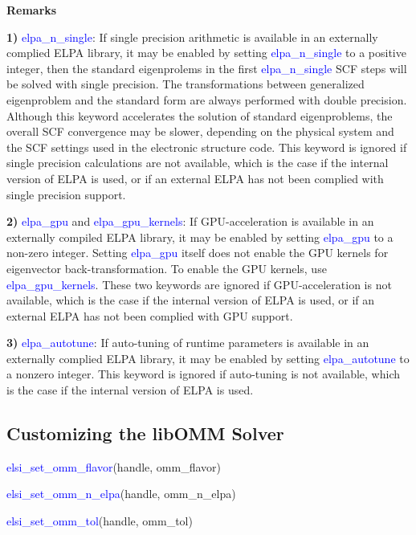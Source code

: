 \documentclass{report}
\begin{document}
\textbf{Remarks}

\textbf{1)} \textcolor{blue}{elpa\_n\_single}: If single precision arithmetic is available in an externally complied ELPA library, it may be enabled by setting \textcolor{blue}{elpa\_n\_single} to a positive integer, then the standard eigenprolems in the first \textcolor{blue}{elpa\_n\_single} SCF steps will be solved with single precision. The transformations between generalized eigenproblem and the standard form are always performed with double precision. Although this keyword accelerates the solution of standard eigenproblems, the overall SCF convergence may be slower, depending on the physical system and the SCF settings used in the electronic structure code. This keyword is ignored if single precision calculations are not available, which is the case if the internal version of ELPA is used, or if an external ELPA has not been complied with single precision support.

\textbf{2)} \textcolor{blue}{elpa\_gpu} and \textcolor{blue}{elpa\_gpu\_kernels}: If GPU-acceleration is available in an externally compiled ELPA library, it may be enabled by setting \textcolor{blue}{elpa\_gpu} to a non-zero integer. Setting \textcolor{blue}{elpa\_gpu} itself does not enable the GPU kernels for eigenvector back-transformation. To enable the GPU kernels, use \textcolor{blue}{elpa\_gpu\_kernels}. These two keywords are ignored if GPU-acceleration is not available, which is the case if the internal version of ELPA is used, or if an external ELPA has not been complied with GPU support.

\textbf{3)} \textcolor{blue}{elpa\_autotune}: If auto-tuning of runtime parameters is available in an externally complied ELPA library, it may be enabled by setting \textcolor{blue}{elpa\_autotune} to a nonzero integer. This keyword is ignored if auto-tuning is not available, which is the case if the internal version of ELPA is used.

\subsection{Customizing the libOMM Solver}
\label{subsec:setter_omm}
\begin{labeling}{\hspace{6cm}}
\item [\hspace{0.3cm} \textcolor{blue}{elsi\_set\_omm\_flavor}(handle, omm\_flavor)]
\item [\hspace{0.3cm} \textcolor{blue}{elsi\_set\_omm\_n\_elpa}(handle, omm\_n\_elpa)]
\item [\hspace{0.3cm} \textcolor{blue}{elsi\_set\_omm\_tol}(handle, omm\_tol)]
\end{labeling}
\end{document}
